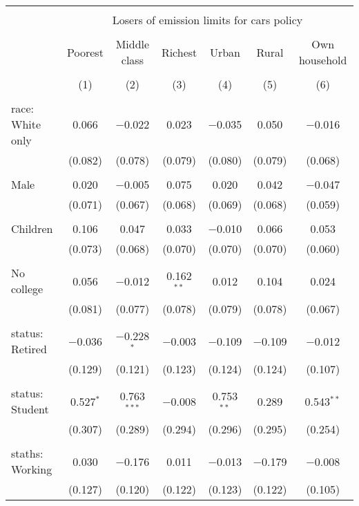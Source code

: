 
\begin{tabular}{@{\extracolsep{5pt}}lcccccc} 
\\[-1.8ex]\hline 
\hline \\[-1.8ex] 
 & \multicolumn{6}{c}{Losers of emission limits for cars policy} \\ 
\cline{2-7} 
\\[-1.8ex] & Poorest & Middle class & Richest & Urban & Rural & Own household \\ 
\\[-1.8ex] & (1) & (2) & (3) & (4) & (5) & (6)\\ 
\hline \\[-1.8ex] 
 race: White only & 0.066 & $-$0.022 & 0.023 & $-$0.035 & 0.050 & $-$0.016 \\ 
  & (0.082) & (0.078) & (0.079) & (0.080) & (0.079) & (0.068) \\ 
  & & & & & & \\ 
 Male & 0.020 & $-$0.005 & 0.075 & 0.020 & 0.042 & $-$0.047 \\ 
  & (0.071) & (0.067) & (0.068) & (0.069) & (0.068) & (0.059) \\ 
  & & & & & & \\ 
 Children & 0.106 & 0.047 & 0.033 & $-$0.010 & 0.066 & 0.053 \\ 
  & (0.073) & (0.068) & (0.070) & (0.070) & (0.070) & (0.060) \\ 
  & & & & & & \\ 
 No college & 0.056 & $-$0.012 & 0.162$^{**}$ & 0.012 & 0.104 & 0.024 \\ 
  & (0.081) & (0.077) & (0.078) & (0.079) & (0.078) & (0.067) \\ 
  & & & & & & \\ 
 status: Retired & $-$0.036 & $-$0.228$^{*}$ & $-$0.003 & $-$0.109 & $-$0.109 & $-$0.012 \\ 
  & (0.129) & (0.121) & (0.123) & (0.124) & (0.124) & (0.107) \\ 
  & & & & & & \\ 
 status: Student & 0.527$^{*}$ & 0.763$^{***}$ & $-$0.008 & 0.753$^{**}$ & 0.289 & 0.543$^{**}$ \\ 
  & (0.307) & (0.289) & (0.294) & (0.296) & (0.295) & (0.254) \\ 
  & & & & & & \\ 
 staths: Working & 0.030 & $-$0.176 & 0.011 & $-$0.013 & $-$0.179 & $-$0.008 \\ 
  & (0.127) & (0.120) & (0.122) & (0.123) & (0.122) & (0.105) \\ 

\end{tabular}
